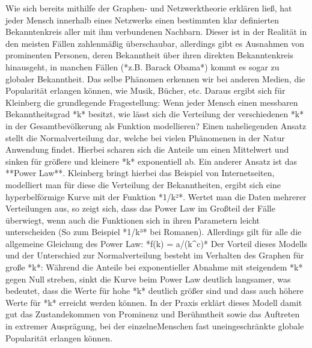 Wie sich bereits mithilfe der Graphen- und Netzwerktheorie erklären ließ, hat jeder Mensch innerhalb eines Netzwerks einen bestimmten klar definierten Bekanntenkreis aller mit ihm verbundenen Nachbarn.
Dieser ist in der Realität in den meisten Fällen zahlenmäßig überschaubar, allerdings gibt es Ausnahmen von prominenten Personen, deren Bekanntheit über ihren direkten Bekanntenkreis hinausgeht, in manchen Fällen (*z.B. Barack Obama*) kommt es sogar zu globaler Bekanntheit.
Das selbe Phänomen erkennen wir bei anderen Medien, die Popularität erlangen können, wie Musik, Bücher, etc.
Daraus ergibt sich für Kleinberg die grundlegende Fragestellung:
Wenn jeder Mensch einen messbaren Bekanntheitsgrad *k* besitzt, wie lässt sich die Verteilung der verschiedenen *k* in der Gesamtbevölkerung als Funktion modellieren?
Einen naheliegenden Ansatz stellt die Normalverteilung dar, welche bei vielen Phänomenen in der Natur Anwendung findet. Hierbei scharen sich die Anteile um einen Mittelwert und sinken für größere und kleinere *k* exponentiell ab.
Ein anderer Ansatz ist das **Power Law**.
Kleinberg bringt hierbei das Beispiel von Internetseiten, modelliert man für diese die Verteilung der Bekanntheiten, ergibt sich eine hyperbelförmige Kurve mit der Funktion *1/k²*.
 Wertet man die Daten mehrerer Verteilungen aus, so zeigt sich, dass das Power Law im Großteil der Fälle überwiegt, wenn auch die Funktionen sich in ihren Parametern leicht unterscheiden (So zum Beispiel *1/k³* bei Romanen).
Allerdings gilt für alle die allgemeine Gleichung des Power Law:
*f(k) = a/(k^c)*
Der Vorteil dieses Modells und der Unterschied zur Normalverteilung besteht im Verhalten des Graphen für große *k*:
Während die Anteile bei exponentieller Abnahme mit steigendem *k* gegen Null streben, sinkt die Kurve beim Power Law deutlich langsamer, was bedeutet, dass die Werte für hohe *k* deutlich größer sind und dass auch höhere Werte für *k* erreicht werden können. In der Praxis erklärt dieses Modell damit gut das Zustandekommen von Prominenz und Berühmtheit sowie das Auftreten in extremer Ausprägung, bei der einzelneMenschen fast uneingeschränkte globale Popularität erlangen können.

